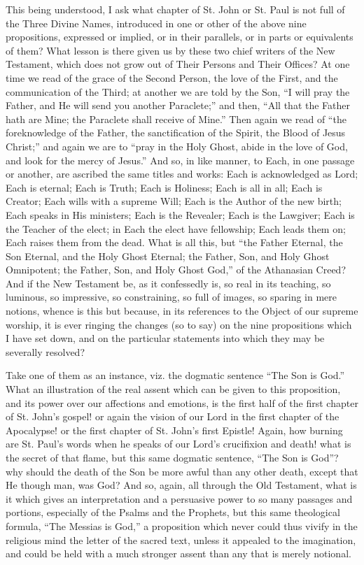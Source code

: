 This being understood, I ask what chapter of St. John or St. Paul
is not full of the Three Divine Names, introduced in one or other of
the above nine propositions, expressed or implied, or in their
parallels, or in parts or equivalents of them? What lesson is there
given us by these two chief writers of the New Testament, which does
not grow out of Their Persons and Their Offices? At one time we read
of the grace of the Second Person, the love of the First, and the
communication of the Third; at another we are told by the Son, ``I
will pray the Father, and He will send you another Paraclete;''
and then, ``All that the Father hath are Mine; the Paraclete shall
receive of Mine.'' Then again we read of ``the
foreknowledge of the Father, the sanctification of the Spirit, the
Blood of Jesus Christ;'' and again we are to ``pray in the
Holy Ghost, abide in the love of God, and look for the mercy of
Jesus.'' And so, in like manner, to Each, in one passage or
another, are ascribed the same titles and works: Each is acknowledged
as Lord; Each is eternal; Each is Truth; Each is Holiness; Each is all
in all; Each is Creator; Each wills with a supreme Will; Each is the
Author of the new birth; Each speaks in His ministers; Each is the
Revealer; Each is the Lawgiver; Each is the Teacher of the elect; in
Each the elect have fellowship; Each leads them on; Each raises them
from the dead. What is all this, but ``the Father Eternal, the Son
Eternal, and the Holy Ghost Eternal; the Father, Son, and Holy Ghost
Omnipotent; the Father, Son, and Holy Ghost God,'' of the
Athanasian Creed? And if the New Testament be, as it confessedly is,
so real in its teaching, so luminous, so impressive, so constraining,
so full of images, so sparing in mere notions, whence is this but
because, in its references to the Object of our supreme worship, it is
ever ringing the changes (so to say) on the nine propositions which I
have set down, and on the particular statements into which they may be
severally resolved?

Take one of them as an instance, viz. the dogmatic sentence
``The Son is God.'' What an illustration of the real assent
which can be given to this proposition, and its power over our
affections and emotions, is the first half of the first chapter of St.
John's gospel! or again the vision of our Lord in the first
chapter of the Apocalypse! or the first chapter of St. John's first
Epistle! Again, how burning are St. Paul's words when he speaks of our
Lord's crucifixion and death! what is the secret of that flame, but
this same dogmatic sentence, ``The Son is God''? why should
the death of the Son be more awful than any other death, except that
He though man, was God? And so, again, all through the Old Testament,
what is it which gives an interpretation and a persuasive power to so
many passages and portions, especially of the Psalms and the Prophets,
but this same theological formula, ``The Messias is God,'' a
proposition which never could thus vivify in the religious mind the
letter of the sacred text, unless it appealed to the imagination, and
could be held with a much stronger assent than any that is merely
notional.

